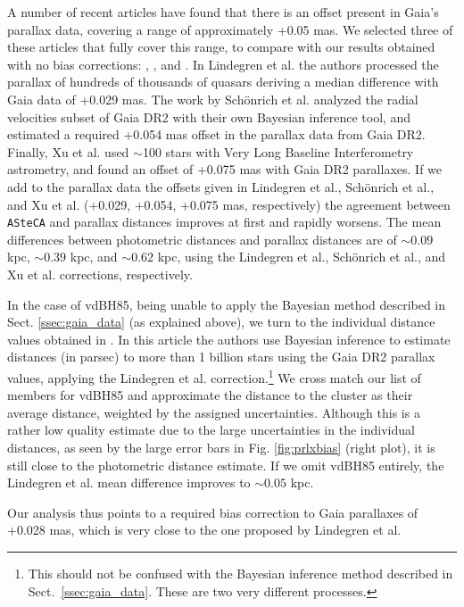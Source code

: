 \documentclass[draft]{aa}
\begin{document}
A number of recent articles have found that there is an offset present in
Gaia's parallax data, covering a range of approximately +0.05 mas. We selected
three of these articles that fully cover this range, to compare with our
results obtained with no bias corrections: \cite{Lindegren_2018},
\cite{Schonrich2019}, and \cite{Xu_2019}.
%
In Lindegren et al. the authors processed the parallax of hundreds of
thousands of quasars deriving a median difference with Gaia data of +0.029 mas.
The work by Sch\"onrich et al. analyzed the radial velocities subset of Gaia
DR2 with their own Bayesian inference tool, and estimated a required +0.054 mas
offset in the parallax data from Gaia DR2. Finally, Xu et al. used $\sim$100
stars with Very Long Baseline Interferometry astrometry, and found an offset of
+0.075 mas with Gaia DR2 parallaxes. 
%
If we add to the parallax data the offsets given in Lindegren et al., 
Sch\"onrich et al., and Xu et al. (+0.029, +0.054, +0.075 mas,
respectively) the agreement between \texttt{ASteCA} and parallax distances
improves at first and rapidly worsens. The mean differences between photometric
distances and parallax distances are of $\sim0.09$ kpc, $\sim0.39$ kpc, and
$\sim0.62$ kpc, using the Lindegren et al., Sch\"onrich et al., and Xu
et al. corrections, respectively.

In the case of vdBH85, being unable to apply the Bayesian method
described in Sect. \ref{ssec:gaia_data} (as explained above), we turn
to the individual distance values obtained in
\cite{BailerJones_2018}.
In this article the authors use Bayesian inference to estimate distances (in
parsec) to more than 1 billion stars using the Gaia DR2 parallax values,
applying the Lindegren et al. correction.\footnote{This should not be
confused with the Bayesian inference method described in
Sect.~\ref{ssec:gaia_data}. These are two very different processes.}
We cross match our list of members for vdBH85 and approximate the distance to
the cluster as their average distance, weighted by the assigned uncertainties.
Although this is a rather low quality estimate due to the large
uncertainties in the individual distances, as seen by the large error bars
in Fig. \ref{fig:prlxbias} (right plot), it is still close to the
photometric distance estimate.
If we omit vdBH85 entirely, the Lindegren et al. mean difference improves to
$\sim0.05$ kpc.

Our analysis thus points to a required bias correction to Gaia parallaxes of
+0.028 mas, which is very close to the one proposed by Lindegren et al.\\
\end{document}
